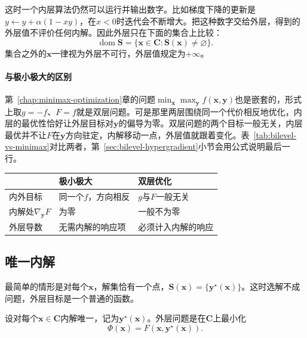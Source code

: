 这时一个内层算法仍然可以运行并输出数字。比如梯度下降的更新是$y\leftarrow y+\alpha(1-xy)$，在$x<0$时迭代会不断增大。把这种数字交给外层，得到的外层值不评价任何内解。因此外层只在下面的集合上比较：
\begin{equation}
 \operatorname{dom}\bm{S}=\{\bm{x}\in\bm{C}:\bm{S}(\bm{x})\neq\varnothing\}.
 \label{eq:bilevel-dom}
\end{equation}
集合之外的$\bm{x}$一律视为外层不可行，外层值规定为$+\infty$。

\paragraph{与极小极大的区别}
第~\ref{chap:minimax-optimization}章的问题$\min_{\bm{x}}\max_{\bm{y}}f(\bm{x},\bm{y})$也是嵌套的，形式上取$g=-f$、$F=f$就是双层问题。可是那里两层围绕同一个代价相反地优化，内层的最优性恰好让外层目标对$\bm{y}$的偏导为零。双层问题的两个目标一般无关，内层最优并不让$F$在$\bm{y}$方向驻定，内解移动一点，外层值就跟着变化。表~\ref{tab:bilevel-vs-minimax}对比两者，第~\ref{sec:bilevel-hypergradient}小节会用公式说明最后一行。

\begin{BookInlineTable}
 \centering
 \begin{tabular}{lll}
  \toprule
  & 极小极大 & 双层优化\\
  \midrule
  内外目标 & 同一个$f$，方向相反 & $g$与$F$一般无关\\
  内解处$\nabla_{\bm{y}}F$ & 为零 & 一般不为零\\
  外层导数 & 无需内解的响应项 & 必须计入内解的响应\\
  \bottomrule
 \end{tabular}
 \caption{极小极大与双层优化的对比。第二、三行假定内解唯一、位于内层可行集内部且相关函数可微。}
 \label{tab:bilevel-vs-minimax}
\end{BookInlineTable}

\subsection{唯一内解}
\label{sec:bilevel-unique}

最简单的情形是对每个$\bm{x}$，解集恰有一个点，$\bm{S}(\bm{x})=\{\bm{y}^\star(\bm{x})\}$。这时选解不成问题，外层目标是一个普通的函数。

\begin{definition}[外层目标]
\label{def:bilevel-outer}
设对每个$\bm{x}\in\bm{C}$内解唯一，记为$\bm{y}^\star(\bm{x})$。外层问题是在$\bm{C}$上最小化
\begin{equation}
 \Phi(\bm{x})=F(\bm{x},\bm{y}^\star(\bm{x})).
 \label{eq:bilevel-phi}
\end{equation}
\end{definition}

